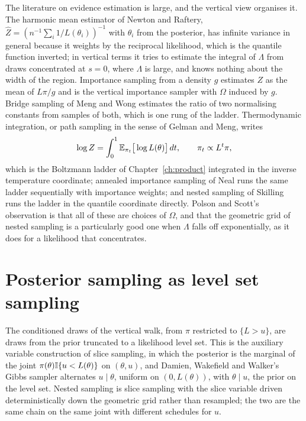The literature on evidence estimation is large, and the vertical view organises it. The harmonic mean estimator of Newton and Raftery, $\hat Z = ( n^{-1} \sum_i 1 / L(\theta_i) )^{-1}$ with $\theta_i$ from the posterior, has infinite variance in general because it weights by the reciprocal likelihood, which is the quantile function inverted; in vertical terms it tries to estimate the integral of $\Lambda$ from draws concentrated at $s = 0$, where $\Lambda$ is large, and knows nothing about the width of the region. Importance sampling from a density $g$ estimates $Z$ as the mean of $L \pi / g$ and is the vertical importance sampler with $\Omega$ induced by $g$. Bridge sampling of Meng and Wong estimates the ratio of two normalising constants from samples of both, which is one rung of the ladder. Thermodynamic integration, or path sampling in the sense of Gelman and Meng, writes
\[
\log Z = \int_0^1 \mathbb{E}_{\pi_t}\big[ \log L(\theta) \big] \, dt , \qquad \pi_t \propto L^t \pi ,
\]
which is the Boltzmann ladder of Chapter~\ref{ch:product} integrated in the inverse temperature coordinate; annealed importance sampling of Neal runs the same ladder sequentially with importance weights; and nested sampling of Skilling~\cite{Skilling} runs the ladder in the quantile coordinate directly. Polson and Scott's~\cite{PolsonScott} observation is that all of these are choices of $\Omega$, and that the geometric grid of nested sampling is a particularly good one when $\Lambda$ falls off exponentially, as it does for a likelihood that concentrates.

\section{Posterior sampling as level set sampling}

The conditioned draws of the vertical walk, from $\pi$ restricted to $\{ L > u \}$, are draws from the prior truncated to a likelihood level set. This is the auxiliary variable construction of slice sampling, in which the posterior is the marginal of the joint $\pi(\theta) \mathbb{I}\{ u < L(\theta) \}$ on $(\theta, u)$, and Damien, Wakefield and Walker's~\cite{DWW} Gibbs sampler alternates $u \mid \theta$, uniform on $(0, L(\theta))$, with $\theta \mid u$, the prior on the level set. Nested sampling is slice sampling with the slice variable driven deterministically down the geometric grid rather than resampled; the two are the same chain on the same joint with different schedules for $u$.

